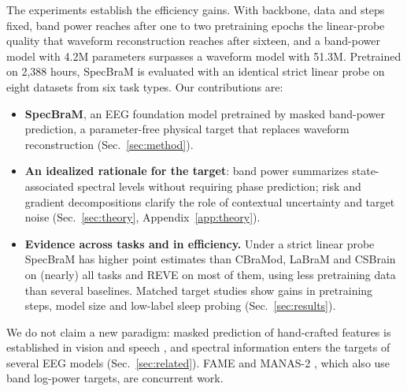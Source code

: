 The experiments establish the efficiency gains. With backbone, data and steps fixed, band power reaches after one to two
pretraining epochs the linear-probe quality that waveform reconstruction reaches after sixteen,
and a band-power model with 4.2M parameters surpasses a waveform model with 51.3M. Pretrained on
2{,}388 hours, SpecBraM is evaluated with an identical strict linear probe on eight datasets
from six task types. Our contributions are:
\begin{itemize}
\item \textbf{SpecBraM}, an EEG foundation model pretrained by masked band-power prediction, a
parameter-free physical target that replaces waveform reconstruction (Sec.~\ref{sec:method}).
\item \textbf{An idealized rationale for the target}: band power summarizes state-associated
spectral levels without requiring phase prediction; risk and gradient decompositions clarify
the role of contextual uncertainty and target noise (Sec.~\ref{sec:theory},
Appendix~\ref{app:theory}).
\item \textbf{Evidence across tasks and in efficiency.} Under a strict linear probe SpecBraM
has higher point estimates than CBraMod, LaBraM and CSBrain on (nearly) all tasks and REVE on
most of them, using less pretraining data than several baselines. Matched target studies show
gains in pretraining steps, model size and low-label sleep probing
(Sec.~\ref{sec:results}).
\end{itemize}

\noindent We do not claim a new paradigm: masked prediction of hand-crafted features is
established in vision \cite{wei2022maskfeat} and speech \cite{hsu2021hubert}, and spectral
information enters the targets of several EEG models (Sec.~\ref{sec:related}).
FAME \cite{yu2026fame} and MANAS-2 \cite{kulkarni2026manas2}, which also use band
log-power targets, are concurrent work.
